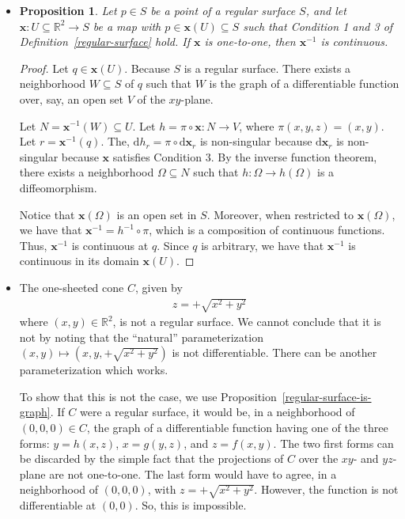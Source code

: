 \documentclass[10pt]{article}
\newtheorem{proposition}[lemma]{Proposition}
\newcommand{\dee}{\mathrm{d}}
\newcommand{\ve}[1]{\mathbf{#1}}
\newcommand{\ra}{\rightarrow}
\newcommand{\Real}{\mathbb{R}}
\newcommand{\sseq}{\subseteq}
\begin{document}
\begin{itemize}
\begin{proof}
      The remaining cases other determinants are not zero are treated in the same way. These cases yield $x = h(y,z)$ and $y = g(x,z)$.
    \end{proof}

    \item \begin{proposition} \label{no-need-to-check-inverse-continuity}
      Let $p \in S$  be a point of a regular surface $S$, and let $\ve{x} : U \sseq \Real^2 \ra S$ be a map with $p \in \ve{x}(U) \sseq S$ such that Condition 1 and 3 of Definition~\ref{regular-surface} hold. If $\ve{x}$ is one-to-one, then $\ve{x}^{-1}$ is continuous.    
    \end{proposition}

    \begin{proof}
      Let $q \in \ve{x}(U)$. Because $S$ is a regular surface. There exists a neighborhood $W \sseq S$ of $q$ such that $W$ is the graph of a differentiable function over, say, an open set $V$ of the $xy$-plane. 

      Let $N = \ve{x}^{-1}(W) \sseq U$. Let $h = \pi \circ \ve{x}: N \ra V$, where $\pi(x,y,z) = (x,y)$. Let $r = \ve{x}^{-1}(q)$. The, $\dee h_r = \pi \circ \dee \ve{x}_r$ is non-singular because $\dee \ve{x}_r$ is non-singular because $\ve{x}$ satisfies Condition 3. By the inverse function theorem, there exists a neighborhood $\Omega \sseq N$ such that $h: \Omega \ra h(\Omega)$ is a diffeomorphism.

      Notice that $\ve{x}(\Omega)$ is an open set in $S$. Moreover, when restricted to $\ve{x}(\Omega)$, we have that $\ve{x}^{-1} = h^{-1} \circ \pi$, which is a composition of continuous functions. Thus, $\ve{x}^{-1}$ is continuous at $q$. Since $q$ is arbitrary, we have that $\ve{x}^{-1}$ is continuous in its domain $\ve{x}(U)$.
    \end{proof}

    \item The one-sheeted cone $C$, given by
    \begin{align*}
      z = + \sqrt{x^2 + y^2}
    \end{align*}
    where $(x,y) \in \Real^2$, is not a regular surface. We cannot conclude that it is not by noting that the ``natural'' parameterization $(x,y) \mapsto (x,y,+\sqrt{x^2 + y^2})$ is not differentiable. There can be another parameterization which works.

    To show that this is not the case, we use Proposition~\ref{regular-surface-is-graph}. If $C$ were a regular surface, it would be, in a neighborhood of $(0,0,0) \in C$, the graph of a differentiable function having one of the three forms: $y = h(x,z)$, $x = g(y,z)$, and $z = f(x,y)$. The two first forms can be discarded by the simple fact that the projections of $C$ over the $xy$- and $yz$-plane are not one-to-one. The last form would have to agree, in a neighborhood of $(0,0,0)$, with $z = + \sqrt{x^2 + y^2}$. However, the function is not differentiable at $(0,0)$. So, this is impossible.


\end{itemize}
\end{document}
